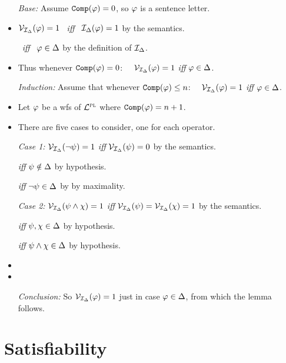\documentclass[a4paper, 11pt]{article} %
\begin{document}
\begin{itemize}
    \item[\it Base:] Assume $\texttt{Comp}(\varphi)=0$, so $\varphi$ is a sentence letter.
      \item $\mathcal{V}_{\mathcal{I}_{\Delta}}(\varphi)=1$ ~\textit{iff}~ $\mathcal{I}_{\Delta}(\varphi) = 1$ by the semantics.
      \item[] \hspace{.75in} ~\textit{iff}~ $\varphi \in \Delta$ by the definition of $\mathcal{I}_{\Delta}$.
      \item Thus whenever $\texttt{Comp}(\varphi) = 0$:~~ $\mathcal{V}_{\mathcal{I}_{\Delta}}(\varphi) = 1$ \textit{iff} $\varphi\in\Delta$.
    \item[\it Induction:] Assume that whenever $\texttt{Comp}(\varphi)\leq n$:~~ $\mathcal{V}_{\mathcal{I}_\Delta}(\varphi)=1$ \textit{iff} $\varphi\in\Delta$.
    \item Let $\varphi$ be a wfs of $\mathcal{L}^{\textsc{pl}}$ where $\texttt{Comp}(\varphi)=n+1$.
    \item There are five cases to consider, one for each operator.
    \item[\it Case 1:] $\mathcal{V}_{\mathcal{I}_\Delta}(\neg\psi)=1$ \textit{iff} $\mathcal{V}_{\mathcal{I}_\Delta}(\psi) = 0$ by the semantics. 
      \item[] \hspace{.86in} \textit{iff} $\psi\notin\Delta$ by hypothesis.
      \item[] \hspace{.86in} \textit{iff} $\neg\psi\in\Delta$ by by maximality.
    \item[\it Case 2:] $\mathcal{V}_{\mathcal{I}_\Delta}(\psi\wedge\chi)=1$ \textit{iff} $\mathcal{V}_{\mathcal{I}_\Delta}(\psi)=\mathcal{V}_{\mathcal{I}_\Delta}(\chi)=1$ by the semantics.     
      \item[] \hspace{.86in} \textit{iff} $\psi,\chi\in\Delta$ by hypothesis.
      \item[] \hspace{.86in} \textit{iff} $\psi\wedge\chi\in\Delta$ by hypothesis.
      \item 
      \item 
    \item[\it Conclusion:] So $\mathcal{V}_{\mathcal{I}_\Delta}(\varphi)=1$ just in case $\varphi\in\Delta$, from which the lemma follows.
\end{itemize}






\section*{Satisfiability}
\end{document}
